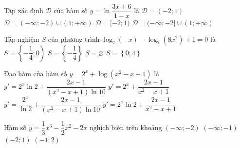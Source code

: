 \begin{ex}%
Tập xác định $\mathscr{D}$ của hàm số $y = \ln\dfrac{3x + 6}{1 - x}$ là
\choice
{\True $\mathscr{D} = (-2; 1)$}
{$\mathscr{D} = (-\infty; -2) \cup (1; +\infty)$}
{$\mathscr{D} = [-2; 1)$}
{$\mathscr{D} = (-\infty; -2] \cup (1; +\infty)$}
\end{ex}

\begin{ex}%
Tập nghiệm $S$ của phương trình $\log_2(-x) - \log_2(8x^2) + 1 = 0$ là
\choice
{$S = \left\lbrace -\dfrac{1}{4}; 0\right)$}
{\True $S = \left\lbrace -\dfrac{1}{4}\right\rbrace$}
{$S = \varnothing$}
{$S = \left\lbrace 0; 4\right\rbrace$}
\end{ex}

\begin{ex}%
Đạo hàm của hàm số $y = 2^x + \log (x^2 - x + 1)$ là
\choice
{\True $y' = 2^x\ln 2 + \dfrac{2x - 1}{(x^2 - x + 1)\ln 10}$}
{$y' = 2^x + \dfrac{2x - 1}{x^2 - x + 1}$}
{$y' = \dfrac{2^x}{\ln 2} + \dfrac{2x - 1}{(x^2 - x + 1)\ln 10}$}
{$y' = 2^x\ln 2 + \dfrac{2x - 1}{x^2 - x + 1}$}
\end{ex}

\begin{ex}%
Hàm số $y = \dfrac{1}{3}x^3 - \dfrac{1}{2}x^2 - 2x$ nghịch biến trên khoảng
\choice
{$(-\infty; -2)$}
{$(-\infty; -1)$}
{$(-2; 1)$}
{\True $(-1; 2)$}
\end{ex}

